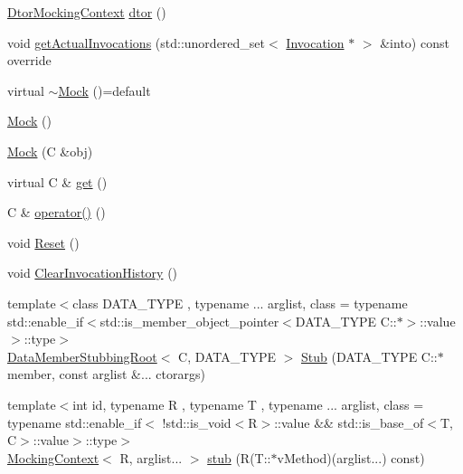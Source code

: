 \begin{DoxyCompactItemize}
\item 
\mbox{\hyperlink{classfakeit_1_1DtorMockingContext}{Dtor\+Mocking\+Context}} \mbox{\hyperlink{classfakeit_1_1Mock_a5c25c5db6e0e1b955137a1330f7348b9}{dtor}} ()
\item 
void \mbox{\hyperlink{classfakeit_1_1Mock_a107ca653b36eb6f72bf9d5acb13c26d8}{get\+Actual\+Invocations}} (std\+::unordered\+\_\+set$<$ \mbox{\hyperlink{structfakeit_1_1Invocation}{Invocation}} $\ast$ $>$ \&into) const override
\item 
virtual \mbox{\hyperlink{classfakeit_1_1Mock_af5ecff29779ab75289c260d0a56705ab}{$\sim$\+Mock}} ()=default
\item 
\mbox{\hyperlink{classfakeit_1_1Mock_af7a86c609a2ee704ee09de6db066c7f4}{Mock}} ()
\item 
\mbox{\hyperlink{classfakeit_1_1Mock_aa474a0d6c7447608253a0fc306eb6ef5}{Mock}} (C \&obj)
\item 
virtual C \& \mbox{\hyperlink{classfakeit_1_1Mock_a139a126982e65ed43a69b21a3a8a6d35}{get}} ()
\item 
C \& \mbox{\hyperlink{classfakeit_1_1Mock_a128ca35e5c7648e0612f017cb7076498}{operator()}} ()
\item 
void \mbox{\hyperlink{classfakeit_1_1Mock_a69c66fc56c032205843b05d91f339a55}{Reset}} ()
\item 
void \mbox{\hyperlink{classfakeit_1_1Mock_ac9e21ef9c73c735287c7fd3dd110aafc}{Clear\+Invocation\+History}} ()
\item 
{\footnotesize template$<$class D\+A\+T\+A\+\_\+\+T\+Y\+PE , typename ... arglist, class  = typename std\+::enable\+\_\+if$<$std\+::is\+\_\+member\+\_\+object\+\_\+pointer$<$\+D\+A\+T\+A\+\_\+\+T\+Y\+P\+E C\+::$\ast$$>$\+::value$>$\+::type$>$ }\\\mbox{\hyperlink{classfakeit_1_1DataMemberStubbingRoot}{Data\+Member\+Stubbing\+Root}}$<$ C, D\+A\+T\+A\+\_\+\+T\+Y\+PE $>$ \mbox{\hyperlink{classfakeit_1_1Mock_ae210824251ca071933f8a651bbe56047}{Stub}} (D\+A\+T\+A\+\_\+\+T\+Y\+PE C\+::$\ast$member, const arglist \&... ctorargs)
\item 
{\footnotesize template$<$int id, typename R , typename T , typename ... arglist, class  = typename std\+::enable\+\_\+if$<$                !std\+::is\+\_\+void$<$\+R$>$\+::value \&\& std\+::is\+\_\+base\+\_\+of$<$\+T, C$>$\+::value$>$\+::type$>$ }\\\mbox{\hyperlink{classfakeit_1_1MockingContext}{Mocking\+Context}}$<$ R, arglist... $>$ \mbox{\hyperlink{classfakeit_1_1Mock_a7a8f38b58b068b35f263eee42d75c162}{stub}} (R(T\+::$\ast$v\+Method)(arglist...) const)

\end{DoxyCompactItemize}
